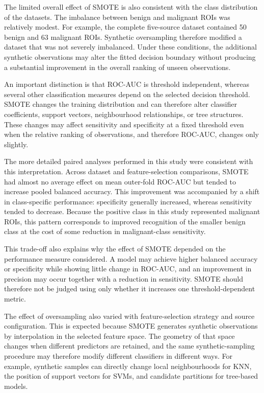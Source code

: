 \documentclass[12pt,twocolumn]{article}
\begin{document}
The limited overall effect of SMOTE is also consistent with the class
distribution of the datasets. The imbalance between benign and
malignant ROIs was relatively modest. For example, the complete
five-source dataset contained 50 benign and 63 malignant ROIs.
Synthetic oversampling therefore modified a dataset that was not
severely imbalanced. Under these conditions, the additional synthetic
observations may alter the fitted decision boundary without producing
a substantial improvement in the overall ranking of unseen
observations.

An important distinction is that ROC-AUC is threshold independent,
whereas several other classification measures depend on the selected
decision threshold. SMOTE changes the training distribution and can
therefore alter classifier coefficients, support vectors,
neighbourhood relationships, or tree structures. These changes may
affect sensitivity and specificity at a fixed threshold even when the
relative ranking of observations, and therefore ROC-AUC, changes only
slightly.

The more detailed paired analyses performed in this study were
consistent with this interpretation. Across dataset and
feature-selection comparisons, SMOTE had almost no average effect on
mean outer-fold ROC-AUC but tended to increase pooled balanced
accuracy. This improvement was accompanied by a shift in
class-specific performance: specificity generally increased, whereas
sensitivity tended to decrease. Because the positive class in this
study represented malignant ROIs, this pattern corresponds to improved
recognition of the smaller benign class at the cost of some reduction
in malignant-class sensitivity.

This trade-off also explains why the effect of SMOTE depended on the
performance measure considered. A model may achieve higher balanced
accuracy or specificity while showing little change in ROC-AUC, and
an improvement in precision may occur together with a reduction in
sensitivity. SMOTE should therefore not be judged using only whether
it increases one threshold-dependent metric.

The effect of oversampling also varied with feature-selection strategy
and source configuration. This is expected because SMOTE generates
synthetic observations by interpolation in the selected feature
space. The geometry of that space changes when different predictors
are retained, and the same synthetic-sampling procedure may therefore
modify different classifiers in different ways. For example,
synthetic samples can directly change local neighbourhoods for KNN,
the position of support vectors for SVMs, and candidate partitions for
tree-based models.
\end{document}
